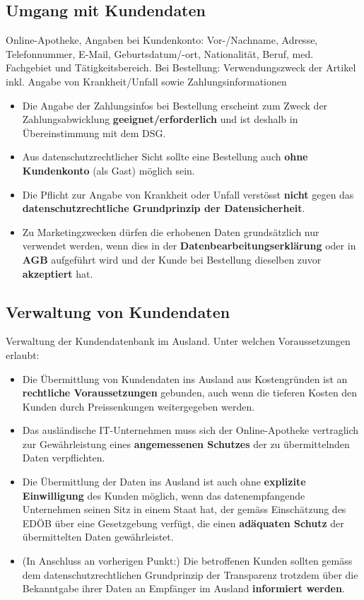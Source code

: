 \subsection{Umgang mit Kundendaten}
Online-Apotheke, Angaben bei Kundenkonto: Vor-/Nachname, Adresse, Telefonnummer, E-Mail, Geburtsdatum/-ort, Nationalität, Beruf, med. Fachgebiet und Tätigkeitsbereich. Bei Bestellung: Verwendungszweck der Artikel inkl. Angabe von Krankheit/Unfall sowie Zahlungsinformationen
\begin{itemize}
	\item Die Angabe der Zahlungsinfos bei Bestellung erscheint zum Zweck der Zahlungsabwicklung \textbf{geeignet/erforderlich} und ist deshalb in Übereinstimmung mit dem DSG.
	\item Aus datenschutzrechtlicher Sicht sollte eine Bestellung auch \textbf{ohne Kundenkonto} (als Gast) möglich sein.
	\item Die Pflicht zur Angabe von Krankheit oder Unfall verstösst \textbf{nicht} gegen das \textbf{datenschutzrechtliche Grundprinzip der Datensicherheit}.
	\item Zu Marketingzwecken dürfen die erhobenen Daten grundsätzlich nur verwendet werden, wenn dies in der \textbf{Datenbearbeitungserklärung} oder in \textbf{AGB} aufgeführt wird und der Kunde bei Bestellung dieselben zuvor \textbf{akzeptiert} hat.
\end{itemize}

\subsection{Verwaltung von Kundendaten}
Verwaltung der Kundendatenbank im Ausland. Unter welchen Voraussetzungen erlaubt:
\begin{itemize}
	\item Die Übermittlung von Kundendaten ins Ausland aus Kostengründen ist an \textbf{rechtliche Voraussetzungen} gebunden, auch wenn die tieferen Kosten den Kunden durch Preissenkungen weitergegeben werden.
	\item Das ausländische IT-Unternehmen muss sich der Online-Apotheke vertraglich zur Gewährleistung eines \textbf{angemessenen Schutzes} der zu übermittelnden Daten verpflichten.
	\item Die Übermittlung der Daten ins Ausland ist auch ohne \textbf{explizite Einwilligung} des Kunden möglich, wenn das datenempfangende Unternehmen seinen Sitz in einem Staat hat, der gemäss Einschätzung des EDÖB über eine Gesetzgebung verfügt, die einen \textbf{adäquaten Schutz} der übermittelten Daten gewährleistet.
	\item (In Anschluss an vorherigen Punkt:) Die betroffenen Kunden sollten gemäss dem datenschutzrechtlichen Grundprinzip der Transparenz trotzdem über die Bekanntgabe ihrer Daten an Empfänger im Ausland \textbf{informiert werden}.
\end{itemize}

